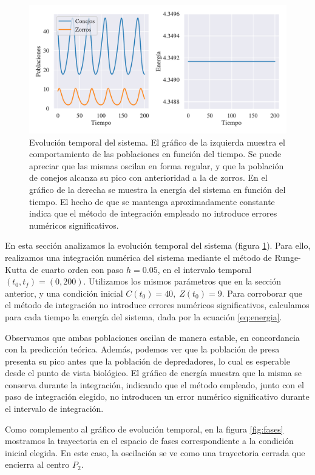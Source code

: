 \documentclass[10pt,twocolumn]{article}
\begin{document}
\begin{figure}[th]
\centering
\includegraphics[scale=0.37]{evolucion_y_energia.pdf}
\caption{\label{fig:evolucion} Evolución temporal del sistema. El gráfico de la izquierda muestra el comportamiento de las poblaciones en función del tiempo. Se puede apreciar que las mismas oscilan en forma regular, y que la población de conejos alcanza su pico con anterioridad a la de zorros. En el gráfico de la derecha se muestra la energía del sistema en función del tiempo. El hecho de que se mantenga aproximadamente constante indica que el método de integración empleado no introduce errores numéricos significativos.}
\end{figure}

En esta sección analizamos la evolución temporal del sistema (figura \ref{fig:evolucion}). Para ello, realizamos una integración numérica del sistema mediante el método de Runge-Kutta de cuarto orden con paso $h = 0.05$, en el intervalo temporal $(t_0, t_f) = (0, 200)$. Utilizamos los mismos parámetros que en la sección anterior, y una condición inicial $C(t_0) = 40,\; Z(t_0)=9$. Para corroborar que el método de integración no introduce errores numéricos significativos, calculamos para cada tiempo la energía del sistema, dada por la ecuación \ref{eq:energia}. 



Observamos que ambas poblaciones oscilan de manera estable, en concordancia con la predicción teórica. Además, podemos ver que la población de presa presenta su pico antes que la población de depredadores, lo cual es esperable desde el punto de vista biológico. El gráfico de energía muestra que la misma se conserva durante la integración, indicando que el método empleado, junto con el paso de integración elegido, no introducen un error numérico significativo durante el intervalo de integración.

Como complemento al gráfico de evolución temporal, en la figura \ref{fig:fases} mostramos la trayectoria en el espacio de fases correspondiente a la condición inicial elegida. En este caso, la oscilación se ve como una trayectoria cerrada que encierra al centro $P_2$.
\end{document}
